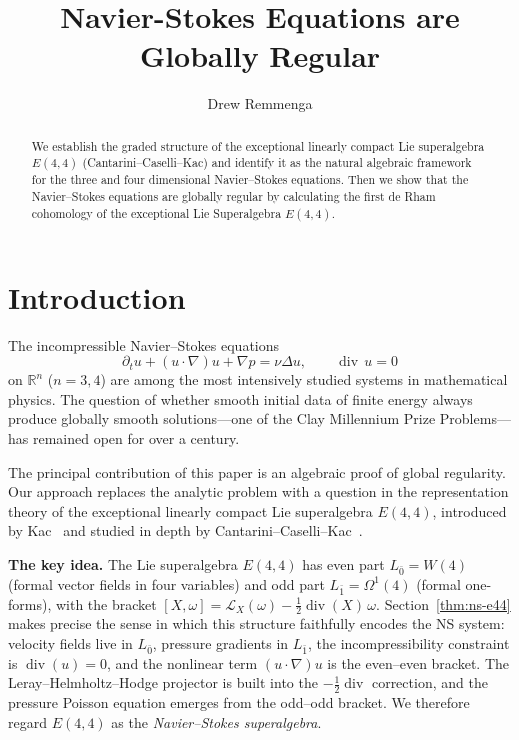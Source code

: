 \documentclass[reqno,10pt]{amsart}
\theoremstyle{definition}
\begin{document}
\title{Navier-Stokes Equations are Globally Regular}
\author{Drew Remmenga}
\address{
  Unaffiliated\\
  No Department\\
  Fort Collins, CO, 80525\\
  United States
}

\maketitle
\begin{abstract}
We establish the graded structure of the exceptional linearly compact Lie superalgebra
$E(4,4)$ (Cantarini--Caselli--Kac) and identify it as the natural algebraic
framework for the three and four dimensional Navier--Stokes equations.
Then we show that the Navier--Stokes equations are globally regular by calculating the first de Rham cohomology of the exceptional Lie Superalgebra $E(4,4)$.
\end{abstract}
\setcounter{tocdepth}{2}
\section{Introduction}

The incompressible Navier--Stokes equations
\begin{equation}\label{eq:intro-NS}
  \partial_t u + (u\cdot\nabla)u + \nabla p = \nu\Delta u,
  \qquad \operatorname{div}\,u = 0
\end{equation}
on $\mathbb{R}^n$ ($n=3,4$) are among the most intensively studied systems in
mathematical physics.  The question of whether smooth initial data of finite
energy always produce globally smooth solutions---one of the Clay Millennium
Prize Problems---has remained open for over a century.

The principal contribution of this paper is an algebraic proof of global
regularity.  Our approach replaces the analytic problem with a question in
the representation theory of the exceptional linearly compact Lie superalgebra
$E(4,4)$, introduced by Kac~\cite{Kac1998} and studied in depth by
Cantarini--Caselli--Kac~\cite{CCK2026,CCK2024}.

\medskip
\noindent\textbf{The key idea.}
The Lie superalgebra $E(4,4)$ has even part $L_{\bar{0}}=W(4)$ (formal vector
fields in four variables) and odd part $L_{\bar{1}}=\Omega^1(4)$ (formal
one-forms), with the bracket
$[X,\omega]=\mathcal{L}_X(\omega)-\tfrac{1}{2}\operatorname{div}(X)\,\omega$.
Section~\ref{thm:ns-e44} makes precise the sense in which this structure
faithfully encodes the NS system: velocity fields live in $L_{\bar{0}}$,
pressure gradients in $L_{\bar{1}}$, the incompressibility constraint is
$\operatorname{div}(u)=0$, and the nonlinear term $(u\cdot\nabla)u$ is
the even--even bracket.  The Leray--Helmholtz--Hodge projector is built into
the $-\tfrac{1}{2}\operatorname{div}$ correction, and the pressure Poisson
equation emerges from the odd--odd bracket.  We therefore regard
$E(4,4)$ as the \emph{Navier--Stokes superalgebra}.
\end{document}
